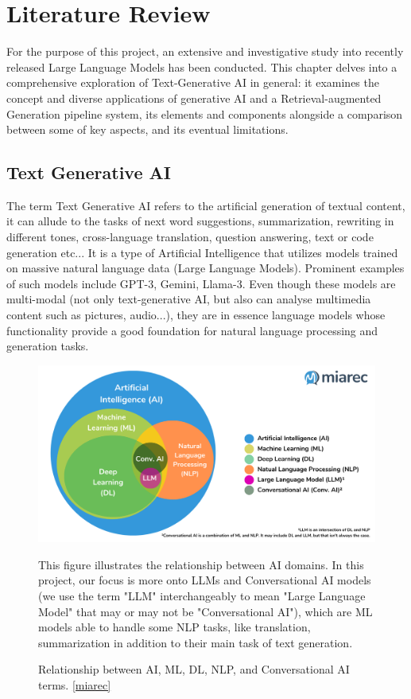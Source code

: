 \chapter{Literature Review}
For the purpose of this project, an extensive and investigative study into recently released Large Language Models has been conducted. This chapter delves into a comprehensive exploration of Text-Generative AI in general: it examines the concept and diverse applications of generative AI and a Retrieval-augmented Generation pipeline system, its elements and components alongside a comparison between some of key aspects, and its eventual limitations.
\newpage

\section{Text Generative AI}
The term Text Generative AI refers to the artificial generation of textual content, it can allude to the tasks of next word suggestions, summarization, rewriting in different tones, cross-language translation, question answering, text or code generation etc...
It is a type of Artificial Intelligence that utilizes models trained on massive natural language data (Large Language Models). Prominent examples of such models include GPT-3, Gemini, Llama-3. Even though these models are multi-modal (not only text-generative AI, but also can analyse multimedia content such as pictures, audio...), they are in essence language models whose functionality provide a good foundation for natural language processing and generation tasks.
\begin{figure}[htbp]
    \centering
    \includegraphics[width=\linewidth]{./figures/genai-relation-diagram.png}
    \caption{Relationship between AI, ML, DL, NLP, and Conversational AI terms. \href{https://blog.miarec.com/contact-centers-ai-definition}{[miarec]}}
    \begin{flushleft}
        \small This figure illustrates the relationship between AI domains. In this project, our focus is more onto LLMs and Conversational AI models (we use the term "LLM" interchangeably to mean "Large Language Model" that may or may not be "Conversational AI"), which are ML models able to handle some NLP tasks, like translation, summarization in addition to their main task of text generation.
    \end{flushleft}
\end{figure}\newline
